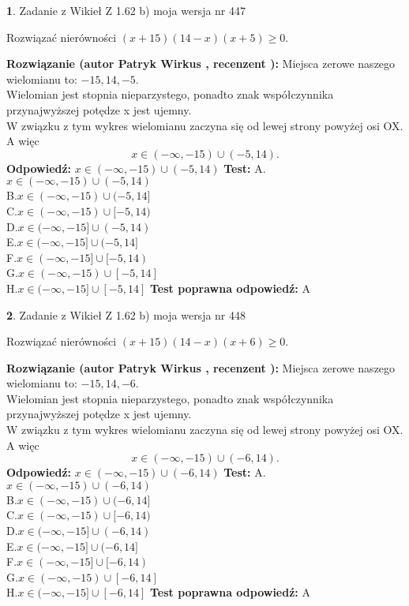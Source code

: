 \documentclass[12pt, a4paper]{article}
\theoremstyle{definition} %
\newtheorem{zad}{}
\newcommand{\zadStart}[1]{\begin{zad}#1\newline}
\newcommand{\zadStop}{\end{zad}}
\newcommand{\rozwStart}[2]{\noindent \textbf{Rozwiązanie (autor #1 , recenzent #2): }\newline}
\newcommand{\rozwStop}{\newline}
\newcommand{\odpStart}{\noindent \textbf{Odpowiedź:}\newline}
\newcommand{\odpStop}{\newline}
\newcommand{\testStart}{\noindent \textbf{Test:}\newline}
\newcommand{\testStop}{\newline}
\newcommand{\kluczStart}{\noindent \textbf{Test poprawna odpowiedź:}\newline}
\newcommand{\kluczStop}{\newline}
\begin{document}
\zadStart{Zadanie z Wikieł Z 1.62 b) moja wersja nr 447}

Rozwiązać nierówności $(x+15)(14-x)(x+5)\ge0$.
\zadStop
\rozwStart{Patryk Wirkus}{}
Miejsca zerowe naszego wielomianu to: $-15, 14, -5$.\\
Wielomian jest stopnia nieparzystego, ponadto znak współczynnika przy\linebreak najwyższej potędze x jest ujemny.\\ W związku z tym wykres wielomianu zaczyna się od lewej strony powyżej osi OX. A więc $$x \in (-\infty,-15) \cup (-5,14).$$
\rozwStop
\odpStart
$x \in (-\infty,-15) \cup (-5,14)$
\odpStop
\testStart
A.$x \in (-\infty,-15) \cup (-5,14)$\\
B.$x \in (-\infty,-15) \cup (-5,14]$\\
C.$x \in (-\infty,-15) \cup [-5,14)$\\
D.$x \in (-\infty,-15] \cup (-5,14)$\\
E.$x \in (-\infty,-15] \cup (-5,14]$\\
F.$x \in (-\infty,-15] \cup [-5,14)$\\
G.$x \in (-\infty,-15) \cup [-5,14]$\\
H.$x \in (-\infty,-15] \cup [-5,14]$
\testStop
\kluczStart
A
\kluczStop



\zadStart{Zadanie z Wikieł Z 1.62 b) moja wersja nr 448}

Rozwiązać nierówności $(x+15)(14-x)(x+6)\ge0$.
\zadStop
\rozwStart{Patryk Wirkus}{}
Miejsca zerowe naszego wielomianu to: $-15, 14, -6$.\\
Wielomian jest stopnia nieparzystego, ponadto znak współczynnika przy\linebreak najwyższej potędze x jest ujemny.\\ W związku z tym wykres wielomianu zaczyna się od lewej strony powyżej osi OX. A więc $$x \in (-\infty,-15) \cup (-6,14).$$
\rozwStop
\odpStart
$x \in (-\infty,-15) \cup (-6,14)$
\odpStop
\testStart
A.$x \in (-\infty,-15) \cup (-6,14)$\\
B.$x \in (-\infty,-15) \cup (-6,14]$\\
C.$x \in (-\infty,-15) \cup [-6,14)$\\
D.$x \in (-\infty,-15] \cup (-6,14)$\\
E.$x \in (-\infty,-15] \cup (-6,14]$\\
F.$x \in (-\infty,-15] \cup [-6,14)$\\
G.$x \in (-\infty,-15) \cup [-6,14]$\\
H.$x \in (-\infty,-15] \cup [-6,14]$
\testStop
\kluczStart
A
\kluczStop
\end{document}
